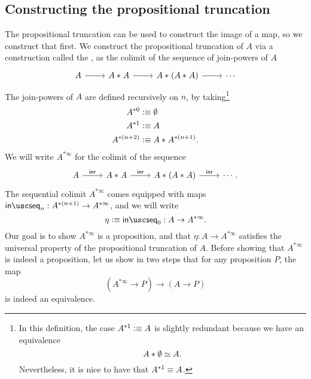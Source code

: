 \subsection{Constructing the propositional truncation}\label{sec:propositional-truncation-constr}
The propositional truncation can be used to construct the image of a map, so we construct that first. We construct the propositional truncation of $A$ via a construction called the , as the colimit of the sequence of join-powers of $A$
\begin{equation*}
  \begin{tikzcd}
    A \arrow[r] & \join{A}{A} \arrow[r] & \join{A}{(\join{A}{A})} \arrow[r] & \cdots
  \end{tikzcd}
\end{equation*}
The join-powers of $A$ are defined recursively on $n$, by taking\footnote{In this definition, the case $A^{\ast1}\vcentcolon\equiv A$ is slightly redundant because we have an equivalence
\begin{equation*}
  {A}\ast_{}{\emptyset}\simeq A.
\end{equation*}
Nevertheless, it is nice to have that $A^{\ast 1}\equiv A$.}
\begin{align*}
  A^{\ast0} & \vcentcolon\equiv \emptyset \\
  A^{\ast 1} & \vcentcolon\equiv A \\
  A^{\ast(n+2)} & \vcentcolon\equiv {A}\ast_{}{A^{\ast (n+1)}}.
\end{align*}
We will write $A^{\ast\infty}$ for the colimit of the sequence
\begin{equation*}
  \begin{tikzcd}
    A \arrow[r,"\inr"] & \join{A}{A} \arrow[r,"\inr"] & \join{A}{(\join{A}{A})} \arrow[r,"\inr"] & \cdots.
  \end{tikzcd}
\end{equation*}
The sequential colimit $A^{\ast\infty}$ comes equipped with maps $\inseq_n:A^{\ast (n+1)}\to A^{\ast\infty}$, and we will write
\begin{equation*}
  \eta\defeq\inseq_0:A\to A^{\ast\infty}.
\end{equation*}
Our goal is to show $A^{\ast\infty}$ is a proposition, and that $\eta:A\to A^{\ast\infty}$ satisfies the universal property of the propositional truncation of $A$. Before showing that $A^{\ast\infty}$ is indeed a proposition, let us show in two steps that for any proposition $P$, the map
\begin{equation*}
  (A^{\ast\infty}\to P)\to (A\to P)
\end{equation*}
is indeed an equivalence. 

